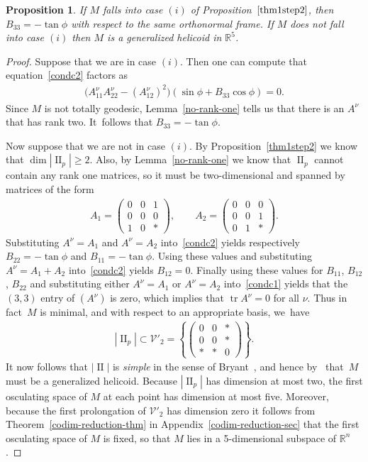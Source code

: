 \documentclass[pdftex]{sigma}
\def\R{\mathbb{R}}
\def\II{\operatorname{II}} %
\def\V{\mathscr{V}}
\def\tr{\operatorname{tr}}
\newtheorem{Proposition}[Theorem]{Proposition}
\numberwithin{equation}{section}
\begin{document}
\begin{Proposition} \label{thm1step3}
If $M$ falls into case $(i)$ of Proposition~$\ref{thm1step2}$, then $B_{33}=-\tan\phi$ with respect to the same orthonormal frame.
If $M$ does not fall into case $(i)$ then $M$ is a generalized helicoid in $\R^5$.
\end{Proposition}
\begin{proof}
Suppose that we are in case $(i)$. Then one can compute that equation~\eqref{condc2} factors as
\begin{gather*}
\big(A^\nu_{11} A^\nu_{22}-(A^\nu_{12})^2\big) (\sin\phi + B_{33}\cos\phi) = 0.
\end{gather*}
Since $M$ is not totally geodesic, Lemma~\ref{no-rank-one} tells us that there is an $A^\nu$ that has rank two. It~follows that $B_{33}=-\tan\phi$.

Now suppose that we are not in case $(i)$. By Proposition~\ref{thm1step2} we know that $\dim |\II_p| \ge 2$. Also, by Lemma~\ref{no-rank-one} we know that $\II_p$ cannot contain any rank one matrices, so it must be two-dimensional and spanned by matrices of the form
\begin{gather*}
A_1 = \begin{pmatrix} 0 & 0 & 1 \\ 0 & 0 & 0 \\ 1 & 0 & * \end{pmatrix}, \qquad
A_2 = \begin{pmatrix} 0 & 0 & 0 \\ 0 & 0 & 1 \\ 0 & 1 & * \end{pmatrix}.
\end{gather*}
{\sloppy Substituting $A^\nu=A_1$ and $A^\nu=A_2$ into~\eqref{condc2} yields respectively $B_{22} = -\tan \phi$ and \mbox{$B_{11}=-\tan\phi$}. Using these values
and substituting $A^\nu = A_1 + A_2$ into~\eqref{condc2} yields $B_{12}=0$. Fina\-lly using these values for $B_{11}$, $B_{12}$, $B_{22}$ and substituting either $A^\nu= A_1$ or $A^\nu =A_2$ into~\eqref{condc1} yields that the $(3,3)$ entry of $(A^{\nu})$ is zero, which implies that $\tr A^\nu = 0$ for all $\nu$. Thus in fact~$M$ is minimal, and with respect to an appropriate basis, we~have
\begin{gather*}
|\II_p| \subset \V'_2= \left\{\!\! \begin{pmatrix} 0 & 0 & * \\ 0 & 0 & * \\ * & * & 0\end{pmatrix} \!\!\right\}.
\end{gather*}}\noindent
It now follows that $|\II|$ is \emph{simple} in the sense of Bryant~\cite{Br}, and hence by~\cite[Theorem 3.1]{Br} that~$M$ must be a generalized helicoid. Because $|\II_p|$ has dimension at most two, the first osculating space of $M$ at each point has dimension at most five. Moreover, because the first prolongation of $\V'_2$ has dimension zero it follows from Theorem~\ref{codim-reduction-thm} in Appendix~\ref{codim-reduction-sec} that the first osculating space of $M$ is fixed, so that $M$ lies in a 5-dimensional subspace of $\R^n$.
\end{proof}
\end{document}
